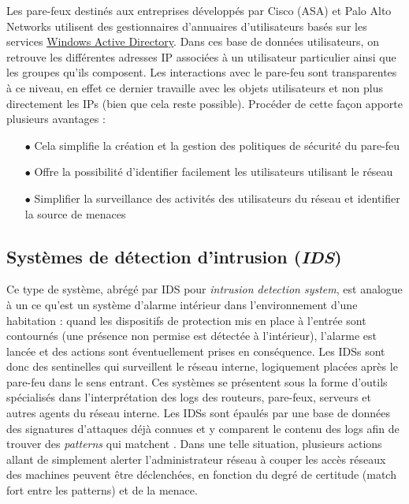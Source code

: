 \documentclass[]{article}
\begin{document}
\par Les pare-feux destinés aux entreprises développés par Cisco (ASA) \cite{cisco2018} et Palo Alto Networks \cite{Kokko2017} utilisent des gestionnaires d'annuaires d'utilisateurs basés sur les services \href{https://fr.wikipedia.org/wiki/Active_Directory}{Windows Active Directory}. Dans ces base de données utilisateurs, on retrouve les différentes adresses IP associées à un utilisateur particulier ainsi que les groupes qu'ils composent. Les interactions avec le pare-feu sont transparentes à ce niveau, en effet ce dernier travaille avec les objets \og utilisateurs \fg et non plus directement les IPs (bien que cela reste possible). Procéder de cette façon apporte plusieurs avantages \cite{cisco2018}:
\vspace{0.2cm}
\begin{itemize}
\item[$\bullet$] Cela simplifie la création et la gestion des politiques de sécurité du pare-feu
\vspace{0.2cm}
\item[$\bullet$] Offre la possibilité d'identifier facilement les utilisateurs utilisant le réseau
\vspace{0.2cm}
\item[$\bullet$] Simplifier la surveillance des activités des utilisateurs du réseau et identifier la source de menaces
\end{itemize} 

\newpage

\subsection{Systèmes de détection d'intrusion (\textit{IDS})}\label{IDS}
Ce type de système, abrégé par IDS pour \textit{intrusion detection system}, est analogue à un ce qu'est un système d'alarme intérieur dans l'environnement d'une habitation : quand les dispositifs de protection mis en place à l'entrée sont contournés (une présence non permise est détectée à l'intérieur), l'alarme est lancée et des actions sont éventuellement prises en conséquence. Les IDSs sont donc des sentinelles qui surveillent le réseau interne, logiquement placées après le pare-feu dans le sens entrant. Ces systèmes se présentent sous la forme d'outils spécialisés dans l’interprétation des logs des routeurs, pare-feux, serveurs et autres agents du réseau interne. Les IDSs sont épaulés par une base de données des signatures d'attaques déjà connues et y comparent le contenu des logs afin de trouver des \textit{patterns} qui matchent \cite{Shimonski2013}. Dans une telle situation, plusieurs actions allant de simplement alerter l'administrateur réseau à couper les accès réseaux des machines peuvent être déclenchées, en fonction du degré de certitude (match fort entre les patterns) et de la menace.\\
\end{document}
